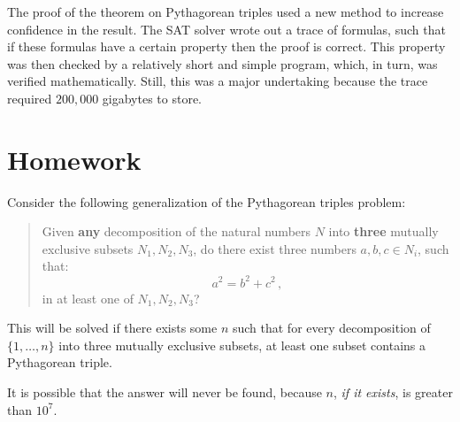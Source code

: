 \documentclass[11pt,a4paper]{article}
\begin{document}
The proof of the theorem on Pythagorean triples used a new method to increase confidence in the result. The SAT solver wrote out a trace of formulas, such that if these formulas have a certain property then the proof is correct. This property was then checked by a relatively short and simple program, which, in turn, was verified mathematically. Still, this was a major undertaking because the trace required $200,000$ gigabytes to store.

\section{Homework}

Consider the following generalization of the Pythagorean triples problem:
\begin{quote}
Given \textbf{any} decomposition of the natural numbers $N$ into \textbf{three} mutually exclusive subsets $N_1,N_2,N_3$, do there exist three numbers $a,b,c\in N_i$, such that:
\[
a^2=b^2+c^2\,,
\]
in at least one of $N_1,N_2,N_3$?
\end{quote}
This will be solved if there exists some $n$ such that for every decomposition of $\{1,\ldots,n\}$ into three mutually exclusive subsets, at least one subset contains a Pythagorean triple.

It is possible that the answer will never be found, because $n$, \emph{if it exists}, is greater than $10^7$.
\end{document}

